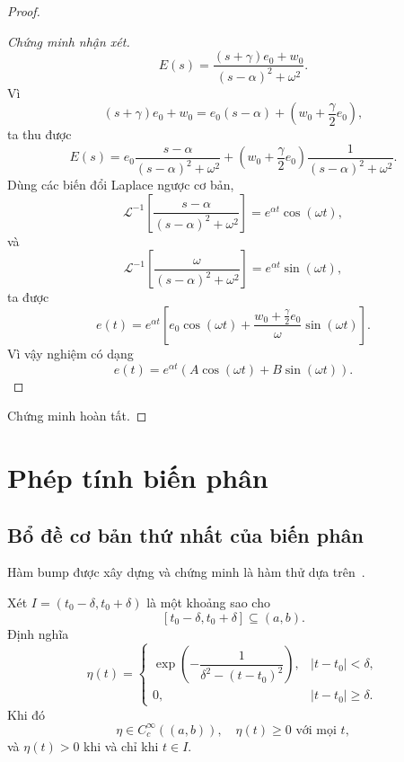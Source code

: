 ﻿\documentclass[12pt]{article}
\begin{document}
\begin{proof}
\begin{proof}[Chứng minh nhận xét]
\[
 E(s) = \frac{(s + \gamma)e_0 + w_0}{(s - \alpha)^2 + \omega^2}.
\]
Vì
\[
 (s + \gamma)e_0 + w_0
 =
 e_0(s - \alpha)
 +
 \left(w_0 + \frac{\gamma}{2}e_0\right),
\]
ta thu được
\[
 E(s)
 =
 e_0\frac{s - \alpha}{(s - \alpha)^2 + \omega^2}
 +
 \left(w_0 + \frac{\gamma}{2}e_0\right)
 \frac{1}{(s - \alpha)^2 + \omega^2}.
\]
Dùng các biến đổi Laplace ngược cơ bản,
\[
 \mathcal L^{-1}\left[
 \frac{s - \alpha}{(s - \alpha)^2 + \omega^2}
 \right]
 =
 e^{\alpha t}\cos(\omega t),
\]
và
\[
 \mathcal L^{-1}\left[
 \frac{\omega}{(s - \alpha)^2 + \omega^2}
 \right]
 =
 e^{\alpha t}\sin(\omega t),
\]
ta được
\[
 e(t)
 =
 e^{\alpha t}
 \left[
 e_0\cos(\omega t)
 +
 \frac{w_0 + \frac{\gamma}{2}e_0}{\omega}\sin(\omega t)
 \right].
\]
Vì vậy nghiệm có dạng
\[
 e(t) = e^{\alpha t}\left(A\cos(\omega t) + B\sin(\omega t)\right).
\]
\end{proof}
Chứng minh hoàn tất.
\end{proof}

\section{Phép tính biến phân}
\subsection{Bổ đề cơ bản thứ nhất của biến phân}
Hàm bump được xây dựng và chứng minh là hàm thử dựa trên~\cite{lee_smooth_manifolds}.
\begin{lemma}
Xét $I = (t_0 - \delta, t_0 + \delta)$ là một khoảng sao cho
\[
 [t_0 - \delta, t_0 + \delta] \subseteq(a, b).
\]
Định nghĩa
\[
\eta(t) =
\begin{cases}
\exp\left(-\dfrac{1}{\delta^2 - (t - t_0)^2}\right),
& |t - t_0| < \delta,\\[1em]
0,
& |t - t_0| \geq \delta.
\end{cases}
\]
Khi đó
\[
 \eta \in C_c^\infty((a, b)),\quad \eta(t) \geq 0 \text{ với mọi }t,
\]
và $\eta(t) > 0$ khi và chỉ khi $t \in I$.
\end{lemma}
\end{document}
